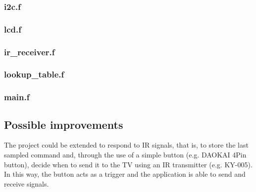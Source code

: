 \documentclass[a4paper, 12pt]{article}
\begin{document}
\subsubsection{i2c.f}

\subsubsection{lcd.f}

\subsubsection{ir\_receiver.f}

\subsubsection{lookup\_table.f}

\subsubsection{main.f}

\subsection{Possible improvements}

The project could be extended to respond to IR signals, that is, to store the last sampled command and, through the use of a simple button (e.g. DAOKAI 4Pin button), decide when to send it to the TV using an IR transmitter (e.g. KY-005). \\
In this way, the button acts as a trigger and the application is able to send and receive signals.
\end{document}
